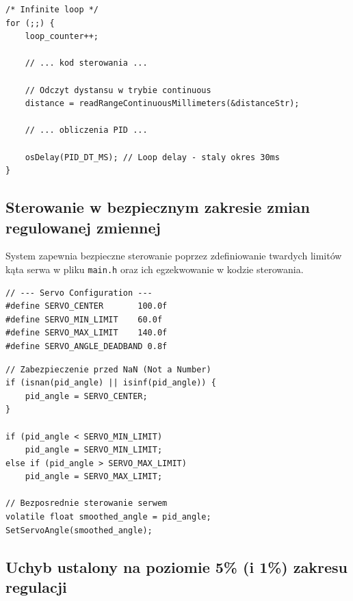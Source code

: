 \documentclass[11pt]{article}
\begin{document}
\begin{lstlisting}[caption={Implementacja stałego okresu w pętli sterowania (main.c)}, style=cstyle]
/* Infinite loop */
for (;;) {
    loop_counter++;
    
    // ... kod sterowania ...
    
    // Odczyt dystansu w trybie continuous
    distance = readRangeContinuousMillimeters(&distanceStr);
    
    // ... obliczenia PID ...
    
    osDelay(PID_DT_MS); // Loop delay - staly okres 30ms
}
\end{lstlisting}

\subsection{Sterowanie w bezpiecznym zakresie zmian regulowanej zmiennej}

System zapewnia bezpieczne sterowanie poprzez zdefiniowanie twardych limitów kąta serwa w pliku \texttt{main.h} oraz ich egzekwowanie w kodzie sterowania.

\begin{lstlisting}[caption={Definicje limitów bezpieczeństwa serwa (main.h)}, style=cstyle]
// --- Servo Configuration ---
#define SERVO_CENTER       100.0f
#define SERVO_MIN_LIMIT    60.0f
#define SERVO_MAX_LIMIT    140.0f
#define SERVO_ANGLE_DEADBAND 0.8f
\end{lstlisting}

\begin{lstlisting}[caption={Saturacja wyjścia PID (main.c)}, style=cstyle]
// Zabezpieczenie przed NaN (Not a Number)
if (isnan(pid_angle) || isinf(pid_angle)) {
    pid_angle = SERVO_CENTER;
}

if (pid_angle < SERVO_MIN_LIMIT)
    pid_angle = SERVO_MIN_LIMIT;
else if (pid_angle > SERVO_MAX_LIMIT)
    pid_angle = SERVO_MAX_LIMIT;

// Bezposrednie sterowanie serwem
volatile float smoothed_angle = pid_angle;
SetServoAngle(smoothed_angle);
\end{lstlisting}

\newpage

\subsection{Uchyb ustalony na poziomie 5\% (i 1\%) zakresu regulacji}
\end{document}
